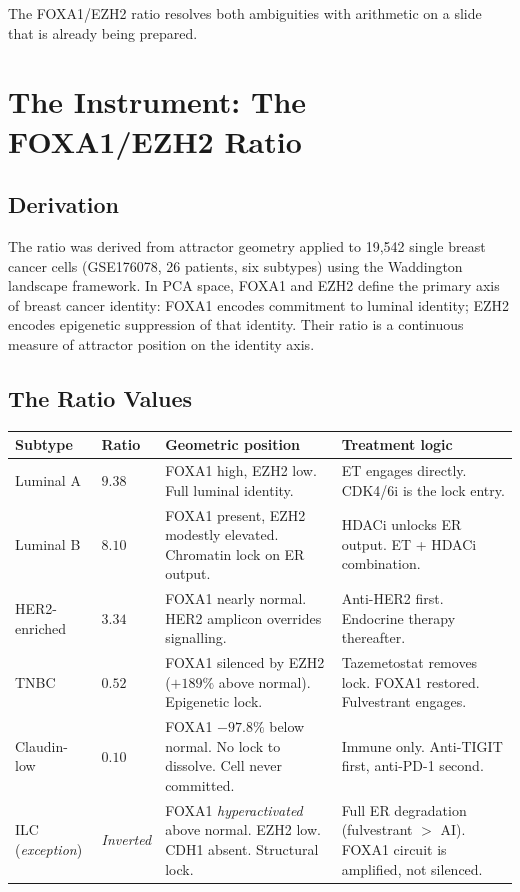 \documentclass[12pt, a4paper]{article}
\begin{document}
The FOXA1/EZH2 ratio resolves both
ambiguities with arithmetic on a slide that
is already being prepared.

\section{The Instrument: The FOXA1/EZH2 Ratio}

\subsection{Derivation}

The ratio was derived from attractor geometry
applied to 19,542 single breast cancer cells
(GSE176078, 26 patients, six subtypes) using
the Waddington landscape framework. In PCA
space, FOXA1 and EZH2 define the primary axis
of breast cancer identity: FOXA1 encodes
commitment to luminal identity; EZH2 encodes
epigenetic suppression of that identity.
Their ratio is a continuous measure of
attractor position on the identity axis.

\subsection{The Ratio Values}

\begin{center}
\begin{tabular}{p{3cm}p{2cm}p{3.5cm}p{4cm}}
\toprule
\textbf{Subtype} &
\textbf{Ratio} &
\textbf{Geometric position} &
\textbf{Treatment logic} \\
\midrule
Luminal A &
$9.38$ &
FOXA1 high, EZH2 low.
Full luminal identity. &
ET engages directly.
CDK4/6i is the lock entry. \\[0.4em]
Luminal B &
$8.10$ &
FOXA1 present, EZH2 modestly elevated.
Chromatin lock on ER output. &
HDACi unlocks ER output.
ET + HDACi combination. \\[0.4em]
HER2-enriched &
$3.34$ &
FOXA1 nearly normal.
HER2 amplicon overrides signalling. &
Anti-HER2 first.
Endocrine therapy thereafter. \\[0.4em]
TNBC &
$0.52$ &
FOXA1 silenced by EZH2
($+189\%$ above normal).
Epigenetic lock. &
Tazemetostat removes lock.
FOXA1 restored. Fulvestrant engages. \\[0.4em]
Claudin-low &
$0.10$ &
FOXA1 $-97.8\%$ below normal.
No lock to dissolve.
Cell never committed. &
Immune only.
Anti-TIGIT first, anti-PD-1 second. \\[0.4em]
\textcolor{ilccol}{ILC}
(\textit{exception}) &
\textit{Inverted} &
FOXA1 \textit{hyperactivated} above normal.
EZH2 low. CDH1 absent.
Structural lock. &
Full ER degradation (fulvestrant $>$ AI).
FOXA1 circuit is amplified, not silenced. \\
\bottomrule
\end{tabular}
\end{center}
\end{document}
